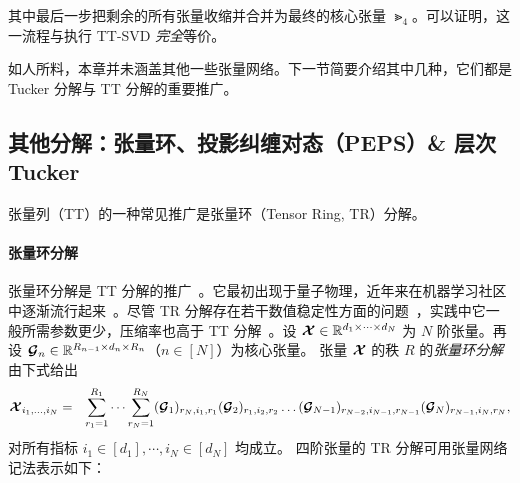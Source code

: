 其中最后一步把剩余的所有张量收缩并合并为最终的核心张量 $\Gt_4$。可以证明，这一流程与执行 TT-SVD \emph{完全}等价。

如人所料，本章并未涵盖其他一些张量网络。下一节简要介绍其中几种，它们都是 Tucker 分解与 TT 分解的重要推广。
\subsection{其他分解：张量环、投影纠缠对态（PEPS）\& 层次 Tucker}

张量列（TT）的一种常见推广是张量环（Tensor Ring, TR）分解。
\paragraph{张量环分解}
张量环分解是 TT 分解的推广~\citep{zhao2016tensor}。它最初出现于量子物理，近年来在机器学习社区中逐渐流行起来~\citep{wang2017efficient,wang2018wide,yuan2018higher}。尽管 TR 分解存在若干数值稳定性方面的问题~\citep{batselier2018trouble,chen2020tensor}，实践中它一般所需参数更少，压缩率也高于 TT 分解~\citep{mickelin2020algorithms}。设 $\bm{\mathcal{X}}\in\mathbb{R}^{d_1\times\dots\times d_N}$
    为 $N$ 阶张量。再设
    $\bm{\mathcal{G}}_n\in\mathbb{R}^{R_{n-1}\times d_n\times R_n}$（$n\in[N]$）为核心张量。
    张量 $\bm{\mathcal{X}}$ 的秩 $R$ 的\emph{张量环分解}由下式给出
\begin{align*}
    \bm{\mathcal{X}}_{i_1,\dots,i_N}=\hspace{0.25cm}\sum_{r_1=1}^{R_1}\dots\sum_{r_{N}=1}^{R_N}
    (\bm{\mathcal{G}}_1)_{r_N,i_1,r_1} (\bm{\mathcal{G}}_2)_{ r_1,i_2,r_2}\dots  (\bm{\mathcal{G}}_{N-1})_{r_{N-2},i_{N-1},r_{N-1}} (\bm{\mathcal{G}}_{N})_{r_{N-1},i_{N},r_N},
\end{align*}
对所有指标 $i_1\in[d_1],\cdots,i_N\in[d_N]$ 均成立。
四阶张量的 TR 分解可用张量网络记法表示如下：
